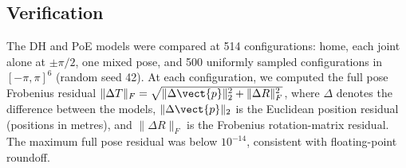 \subsection{Verification}
\label{sec:fk-verification}

The DH and PoE models were compared at 514 configurations: home, each joint
alone at $\pm\pi/2$, one mixed pose, and 500 uniformly sampled configurations
in $[-\pi,\pi]^6$ (random seed 42). At each configuration,
we computed the full pose Frobenius residual
$\lVert\Delta T\rVert_F=\sqrt{\lVert\Delta\vect{p}\rVert_2^2+\lVert\Delta R\rVert_F^2}$,
where $\Delta$ denotes the difference between the models,
$\lVert\Delta\vect{p}\rVert_2$ is the Euclidean position residual (positions in metres),
and $\lVert\Delta R\rVert_F$ is the Frobenius rotation-matrix residual.
The maximum full pose residual was below $10^{-14}$, consistent with
floating-point roundoff.

